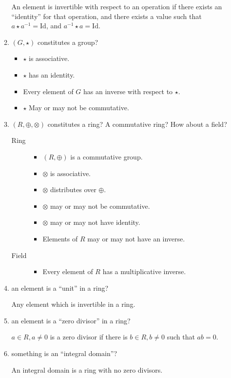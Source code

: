 \documentclass[10pt]{amsart}
\begin{document}
\begin{enumerate}
\begin{enumerate}[listparindent=0.7cm]
        An element is invertible with respect to an operation if there exists
        an ``identity'' for that operation, and there exists a value such that
        $a\star a^{-1}=\text{Id}$, and $a^{-1}\star a=\text{Id}$.
      \item $(G,\star)$ constitutes a group?
        \begin{itemize}
          \item $\star$ is associative.
          \item $\star$ has an identity.
          \item Every element of $G$ has an inverse with respect to $\star$.
          \item $\star$ May or may not be commutative.
        \end{itemize}
      \item $(R,\oplus,\otimes)$ constitutes a ring? A commutative ring? How
        about a field?
        \begin{description}
          \item[Ring] 
            \begin{itemize}
              \item $(R,\oplus)$ is a commutative group.
              \item $\otimes$ is associative.
              \item $\otimes$ distributes over $\oplus$.
              \item $\otimes$ may or may not be commutative.
              \item $\otimes$ may or may not have identity.
              \item Elements of $R$ may or may not have an inverse.
            \end{itemize}
          \item[Field]
            \begin{itemize}
              \item Every element of $R$ has a multiplicative inverse.
            \end{itemize}
        \end{description}
      \item an element is a ``unit'' in a ring?

        Any element which is invertible in a ring.
      \item an element is a ``zero divisor'' in a ring?

        $a\in R,a\neq 0$ is a zero divisor if there is $b\in R,b\neq 0$ such
        that $ab=0$.
      \item something is an ``integral domain''?

        An integral domain is a ring with no zero divisors.
    \end{enumerate}
\end{enumerate}
\end{document}
